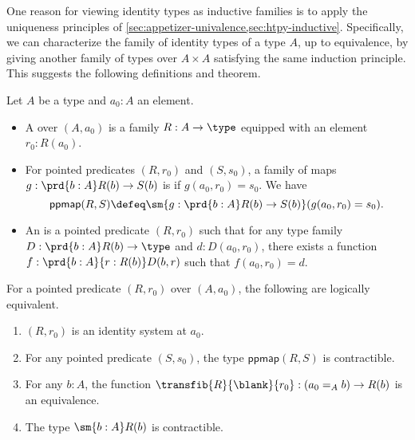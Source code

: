 
\mentalpause

One reason for viewing identity types as inductive families is to apply the uniqueness principles of \cref{sec:appetizer-univalence,sec:htpy-inductive}.
Specifically, we can characterize the family of identity types of a type $A$, up to equivalence, by giving another family of types over $A\times A$ satisfying the same induction principle.
This suggests the following definitions and theorem.

%
%

\begin{defn}\label{defn:identity-systems}
  Let $A$ be a type and $a_0:A$ an element.
  \begin{itemize}
  \item A 
    over $(A,a_0)$ is a family $R:A\to\type$ equipped with an element $r_0:R(a_0)$.
  \item For pointed predicates $(R,r_0)$ and $(S,s_0)$, a family of maps $g:\prd{b:A} R(b) \to S(b)$ is  if $g(a_0, r_0)=s_0$.
    We have
    \[ \mathsf{ppmap}(R,S) \defeq \sm{g:\prd{b:A} R(b) \to S(b)} (g(a_0, r_0)=s_0).\]
  \item An 
    is a pointed predicate $(R,r_0)$ such that for any type family $D:\prd{b:A} R(b) \to \type$ and $d:D(a_0,r_0)$, there exists a function $f:\prd{b:A}{r:R(b)} D(b,r)$ such that $f(a_0,r_0)=d$.
\end{itemize}
\end{defn}

\begin{thm}\label{thm:identity-systems}
  For a pointed predicate $(R,r_0)$ over $(A,a_0)$, the following are logically equivalent.
  \begin{enumerate}
  \item $(R,r_0)$ is an identity system at $a_0$.\label{item:identity-systems1}
  \item For any pointed predicate $(S,s_0)$, the type $\mathsf{ppmap}(R,S)$ is contractible.\label{item:identity-systems2}
  \item For any $b:A$, the function $\transfib{R}{\blank}{r_0} : (a_0 =_A b) \to R(b)$ is an equivalence.\label{item:identity-systems3}
  \item The type $\sm{b:A} R(b)$ is contractible.\label{item:identity-systems4}
  \end{enumerate}
\end{thm}


